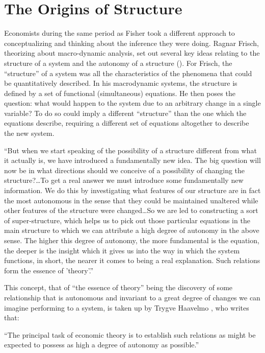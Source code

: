 \documentclass[a4paper,12pt]{article}
\begin{document}
\section{The Origins of Structure}

Economists during the same period as Fisher took a different approach to conceptualizing and thinking about the inference they were doing. Ragnar Frisch, theorizing about macro-dynamic analysis, set out several key ideas relating to the structure of a system and the autonomy of a structure (\cite{Frisch1995}). For Frisch, the ``structure'' of a system was all the characteristics of the phenomena that could be quantitatively described. In his macrodynamic systems, the structure is defined by a set of functional (simultaneous) equations. He then poses the question: what would happen to the system due to an arbitrary change in a single variable? To do so could imply a different ``structure'' than the one which the equations describe, requiring a different set of equations altogether to describe the new system.

\begin{displayquote}
``But when we start speaking of the possibility of a structure different from what it actually is, we have introduced a fundamentally new idea. The big question will now be in what directions should we conceive of a possibility of changing the structure?\ldots To get a real answer we must introduce some fundamentally new information. We do this by investigating what features of our structure are in fact the most autonomous in the sense that they could be maintained unaltered while other features of the structure were changed\ldots So we are led to constructing a sort of super-structure, which helps us to pick out those particular equations in the main structure to which we can attribute a high degree of autonomy in the above sense. The higher this degree of autonomy, the more fundamental is the equation, the deeper is the insight which it gives us into the way in which the system functions, in short, the nearer it comes to being a real explanation. Such relations form the essence of 'theory'.''
\end{displayquote}

This concept, that of ``the essence of theory'' being the discovery of some relationship that is autonomous and invariant to a great degree of changes we can imagine performing to a system, is taken up by Trygve Haavelmo \parencite*{Haavelmo1944}, who writes that:

\begin{displayquote}
``The principal task of economic theory is to establish such relations as might be expected to possess as high a degree of autonomy as possible.''
\end{displayquote}
\end{document}
